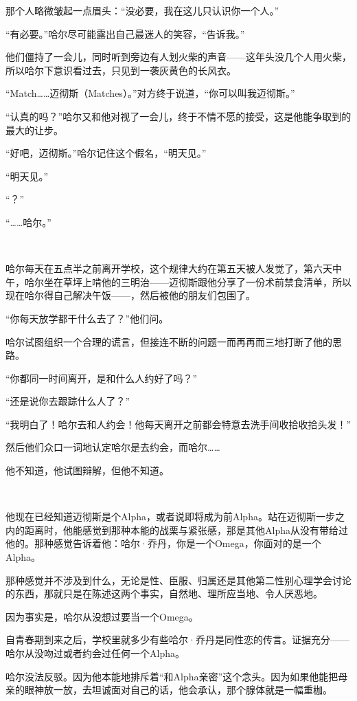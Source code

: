 \documentclass[../main]{subfiles}
\begin{document}
那个人略微皱起一点眉头：“没必要，我在这儿只认识你一个人。”

“有必要。”哈尔尽可能露出自己最迷人的笑容，“告诉我。”

他们僵持了一会儿，同时听到旁边有人划火柴的声音——这年头没几个人用火柴，所以哈尔下意识看过去，只见到一袭灰黄色的长风衣。

“Match……迈彻斯（Matches）。”对方终于说道，“你可以叫我迈彻斯。”

“认真的吗？”哈尔又和他对视了一会儿，终于不情不愿的接受，这是他能争取到的最大的让步。

“好吧，迈彻斯。”哈尔记住这个假名，“明天见。”

“明天见。”

“？”

“……哈尔。”

~\

哈尔每天在五点半之前离开学校，这个规律大约在第五天被人发觉了，第六天中午，哈尔坐在草坪上啃他的三明治——迈彻斯跟他分享了一份术前禁食清单，所以现在哈尔得自己解决午饭——，然后被他的朋友们包围了。

“你每天放学都干什么去了？”他们问。

哈尔试图组织一个合理的谎言，但接连不断的问题一而再再而三地打断了他的思路。

“你都同一时间离开，是和什么人约好了吗？”

“还是说你去跟踪什么人了？”

“我明白了！哈尔去和人约会！他每天离开之前都会特意去洗手间收拾收拾头发！”

然后他们众口一词地认定哈尔是去约会，而哈尔……

他不知道，他试图辩解，但他不知道。

~\

他现在已经知道迈彻斯是个Alpha，或者说即将成为前Alpha。站在迈彻斯一步之内的距离时，他能感觉到那种本能的战栗与紧张感，那是其他Alpha从没有带给过他的。那种感觉告诉着他：哈尔·乔丹，你是一个Omega，你面对的是一个Alpha。

那种感觉并不涉及到什么，无论是性、臣服、归属还是其他第二性别心理学会讨论的东西，那就只是在陈述这两个事实，自然地、理所应当地、令人厌恶地。

因为事实是，哈尔从没想过要当一个Omega。

自青春期到来之后，学校里就多少有些哈尔·乔丹是同性恋的传言。证据充分——哈尔从没吻过或者约会过任何一个Alpha。

哈尔没法反驳。因为他本能地排斥着“和Alpha亲密”这个念头。因为如果他能把母亲的眼神放一放，去坦诚面对自己的话，他会承认，那个腺体就是一幅重枷。
\end{document}
